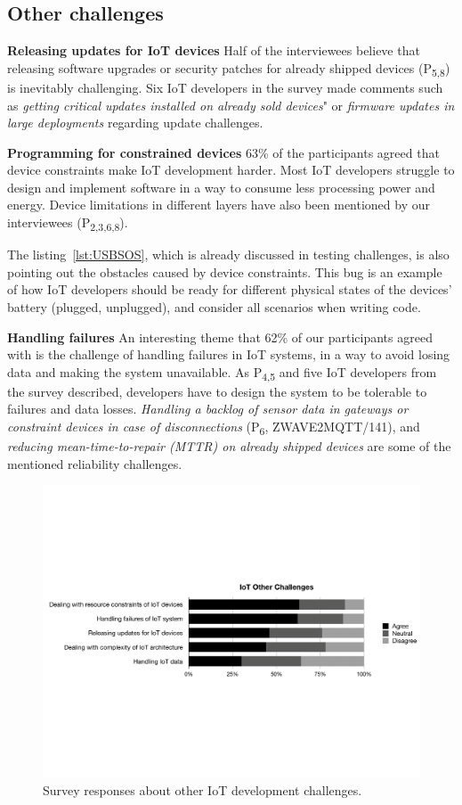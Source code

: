 {\subsection{Other challenges}
\textbf{Releasing updates for IoT devices}  Half of the interviewees believe that releasing software upgrades or security patches for already shipped devices (P\textsubscript{5,8}) is inevitably challenging. Six IoT developers in the survey made comments such as \emph{getting critical updates installed on already sold devices}" or \emph{firmware updates in large deployments} regarding update challenges.

\textbf{Programming for constrained devices}
63\% of the participants agreed that device constraints make IoT development harder. Most IoT developers struggle to design and implement software in a way to consume less processing power and energy. Device limitations in different layers have also been mentioned by our interviewees (P\textsubscript{2,3,6,8}). 

The listing~\autoref{lst:USBSOS}, which is already discussed in testing challenges, is also pointing out the obstacles caused by device constraints. This bug is an example of how IoT developers should be ready for different physical states of the devices' battery (plugged, unplugged), and consider all scenarios when writing code. 

\textbf{Handling failures} An interesting theme that 62\% of our participants agreed with is the challenge of handling failures in IoT systems, in a way to avoid losing data and making the system unavailable. As P\textsubscript{4,5} and five IoT developers from the survey described, developers have to design the system to be tolerable to failures and data losses. \emph{Handling a backlog of sensor data in gateways or constraint devices in case of disconnections} (P\textsubscript{6}, ZWAVE2MQTT/141), and \emph{reducing mean-time-to-repair (MTTR) on already shipped devices} are some of the mentioned reliability challenges. 

 \begin{figure}%
  \centering
   \includegraphics[width=\linewidth]{imgs/survey4}
  \caption{Survey responses about other IoT development challenges.}
  \label{fig:survey4}
\end{figure}

}
